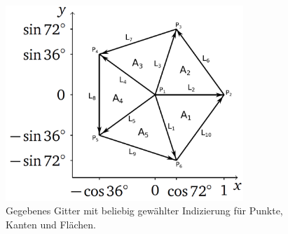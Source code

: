 \documentclass[Protokollheft.tex]{subfiles}
\begin{document}
\begin{figure}[htb]
	\centering
	\includegraphics[width=0.8\textwidth]{Raster_2.pdf}
	\caption{Gegebenes Gitter mit beliebig gewählter Indizierung für Punkte, Kanten und Flächen.}
	\label{abb::5-eck}
\end{figure}
\newpage
\end{document}
